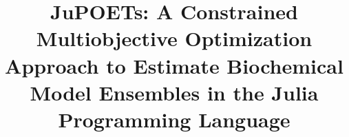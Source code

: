 \documentclass{bmcart}
\begin{document}
\begin{frontmatter}

\begin{fmbox}


\title{JuPOETs: A Constrained Multiobjective Optimization Approach to Estimate Biochemical Model Ensembles in the Julia Programming Language}


\author[
   addressref={aff2},
   email={dmb457@cornell.edu}
]{ }
\author[
  addressref={aff1}
]{ }
\author[
  addressref={aff1}
]{ }
\author[
   addressref={aff2},
   email={jtb47@cornell.edu}
]{ }
\author[
   addressref={aff1},                   %
   corref={aff1},                       %
   email={jdv27@cornell.edu}   %
]{ }


\address[id=aff1]{%
  , %
  ,                     %
  ,                             %
}
\address[id=aff2]{%
  ,
  ,                     %
  ,                             %
}


\end{fmbox}
\end{frontmatter}
\end{document}
